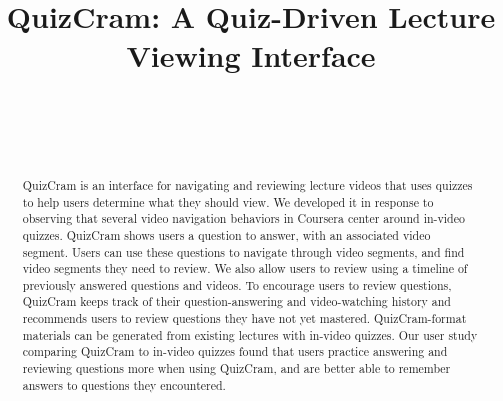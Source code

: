 \documentclass{sigchi}
\begin{document}
\title{QuizCram: A Quiz-Driven Lecture Viewing Interface}

\author{%
  \\
  \\
  \\
}

\maketitle


\begin{abstract}
QuizCram is an interface for navigating and reviewing lecture videos that uses quizzes to help users determine what they should view.
We developed it in response to observing that several video navigation behaviors in Coursera center around in-video quizzes.
QuizCram shows users a question to answer, with an associated video segment.
Users can use these questions to navigate through video segments, and find video segments they need to review.
We also allow users to review using a timeline of previously answered questions and videos.
To encourage users to review questions, QuizCram keeps track of their question-answering and video-watching history and recommends users to review questions they have not yet mastered.
QuizCram-format materials can be generated from existing lectures with in-video quizzes.
Our user study comparing QuizCram to in-video quizzes found that users
practice answering and reviewing questions more when using QuizCram, and
are better able to remember answers to questions they encountered.
\end{abstract}
\end{document}
